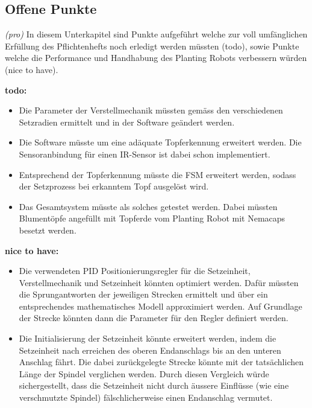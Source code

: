 \subsection{Offene Punkte}
\textit{(pro)} In diesem Unterkapitel sind Punkte aufgeführt welche zur voll umfänglichen Erfüllung des Pflichtenhefts noch erledigt werden müssten (todo), sowie Punkte welche die Performance und Handhabung des Planting Robots verbessern würden (nice to have). 
\newline

\textbf{todo:}
\begin{itemize}
	\item Die Parameter der Verstellmechanik müssten gemäss den verschiedenen Setzradien ermittelt und in der Software geändert werden.
	\item Die Software müsste um eine adäquate Topferkennung erweitert werden. Die Sensoranbindung für einen IR-Sensor ist dabei schon implementiert.
	\item Entsprechend der Topferkennung müsste die FSM erweitert werden, sodass der Setzprozess bei erkanntem Topf ausgelöst wird.
	\item Das Gesamtsystem müsste als solches getestet werden. Dabei müssten Blumentöpfe angefüllt mit Topferde vom Planting Robot mit Nemacaps besetzt werden.
\end{itemize}

\textbf{nice to have:}
\begin{itemize}
	\item Die verwendeten PID Positionierungsregler für die Setzeinheit, Verstellmechanik und Setzeinheit könnten optimiert werden. Dafür müssten die Sprungantworten der jeweiligen Strecken ermittelt und über ein entsprechendes mathematisches Modell approximiert werden. Auf Grundlage der Strecke könnten dann die Parameter für den Regler definiert werden.
	\item Die Initialisierung der Setzeinheit könnte erweitert werden, indem die Setzeinheit nach erreichen des oberen Endanschlags bis an den unteren Anschlag fährt. Die dabei zurückgelegte Strecke könnte mit der tatsächlichen Länge der Spindel verglichen werden. Durch diesen Vergleich würde sichergestellt, dass die Setzeinheit nicht durch äussere Einflüsse (wie eine verschmutzte Spindel) fälschlicherweise einen Endanschlag vermutet.
\end{itemize}
